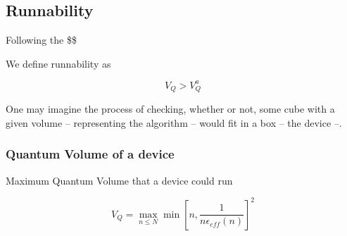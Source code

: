 \documentclass[11pt]{article}
\begin{document}
\subsection{Runnability}
\label{sec:org52ea5b3}

Following the \$\$

We define runnability as 

$$V_Q > V_Q^a$$

One may imagine the process of checking, whether or not, some cube with a given volume -- representing the algorithm -- would fit in a box -- the device --.

\subsubsection{Quantum Volume of a device}
\label{sec:org56ed92e}

Maximum Quantum Volume that a device could run

$$V_Q = \max_{n \le N} \min \left[ n,\frac{1}{n \epsilon_{eff} (n)}\right]^2$$

\end{document}
